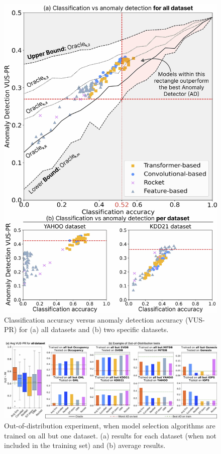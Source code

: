 \begin{figure}
    \centering
    \includegraphics[width=\linewidth]{figures/Fig10.jpg}
        \caption{Classification accuracy versus anomaly detection accuracy (VUS-PR) for (a) all datasets and (b) two specific datasets.}
        \label{fig:class_AD}
\end{figure}


\begin{figure}
    \centering
    \includegraphics[width=\linewidth]{figures/Fig11.jpg}
        \caption{Out-of-distribution experiment, when model selection algorithms are trained on all but one dataset. (a) results for each dataset (when not included in the training set) and (b) average results.
    }
        \label{fig:one_vs_all}
\end{figure}

